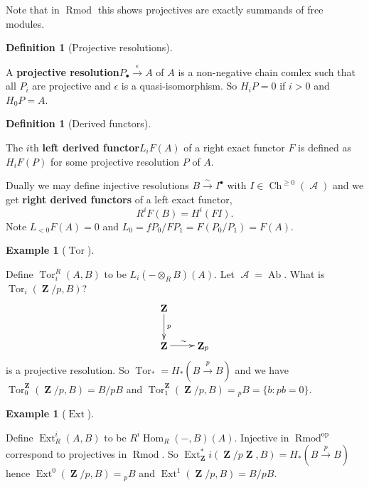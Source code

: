 \documentclass[10pt,]{book}
\newcommand{\lt}{<}
\newcommand{\gt}{>}
\newcommand{\terminology}[1]{\textbf{#1}}
\theoremstyle{plain}
\theoremstyle{definition}
\newtheorem{definition}[theorem]{Definition}
\newtheorem{example}[theorem]{Example}
\numberwithin{equation}{section}
\DeclareMathOperator{\Hom}{Hom}
\DeclareMathOperator{\Tor}{Tor}
\DeclareMathOperator{\Ext}{Ext}
\DeclareMathOperator{\op}{op}
\DeclareMathOperator{\Ch}{Ch}
\DeclareMathOperator{\Ab}{\text{Ab}}
\DeclareMathOperator{\ZZ}{\mathbf{Z}}
\DeclareMathOperator{\Rmod}{R\text{mod}}
\DeclareMathOperator{\cA}{\mathcal{A}}
\begin{document}
          Note that in \(\Rmod\) this shows projectives are exactly summands of free modules.
          
\begin{definition}[Projective resolutions]\label{definition-18}

            A \terminology{projective resolution}\(P_\bullet \xrightarrow{\epsilon} A\) of \(A\) is a non-negative chain comlex such that all \(P_i\) are projective and \(\epsilon\) is a quasi-isomorphism.
            So \(H_i P = 0\) if \(i \gt 0\) and \(H_0 P = A\).
          \end{definition}
\begin{definition}[Derived functors]\label{definition-19}

            The \(i\)th \terminology{left derived functor}\(L_i F(A)\) of a right exact functor \(F\) is defined as \(H_iF(P)\) for some projective resolution \(P\) of \(A\).\newline{}\end{definition}
\par

          Dually we may define injective resolutions \(B \xrightarrow{\sim} I^\bullet\) with \(I \in \Ch^{\ge 0}(\cA)\) and we get \terminology{right derived functors} of a left exact functor,
          \[
            R^i F(B) = H^i (FI ).
          \]
          Note \(L_{\lt 0} F(A) = 0\) and \(L_0= fP_0 / FP_1 = F(P_0/P_1) = F(A)\).
\begin{example}[\(\Tor\)]\label{example-10}

            Define \(\Tor^R_i(A, B)\) to be \(L_i(- \otimes_R B)(A)\).
            Let \(\cA = \Ab\). What is \(\Tor_i(\ZZ/p , B)\)?
            \[
              \xymatrix{\ZZ\ar[d]^p &\\ \ZZ \ar[r]^{\sim} &\ZZ_p}
            \]
            is a projective resolution.
            So \(\Tor_* = H_*(B \xrightarrow{p} B)\) and we have \(\Tor^{\ZZ}_0 (\ZZ/p, B) = B/pB\) and \(\Tor^{\ZZ}_1(\ZZ/p, B) = {}_pB = \{b : pb = 0\}\).
          \end{example}
\begin{example}[\(\Ext\)]\label{example-11}

            Define \(\Ext^i_R(A, B)\) to be \(R^i\Hom_R(-, B)(A)\).
            Injective in \(\Rmod^{\op}\) correspond to projectives in \(\Rmod\).
            So \(\Ext_{\ZZ}^*i(\ZZ/p\ZZ, B) = H_*(B \xrightarrow{p} B)\) hence \(\Ext^0 (\ZZ/p, B) = {}_pB\) and \(\Ext^1(\ZZ/p, B) = B/pB\).
          \end{example}
\typeout{************************************************}
\typeout{************************************************}
\end{document}
